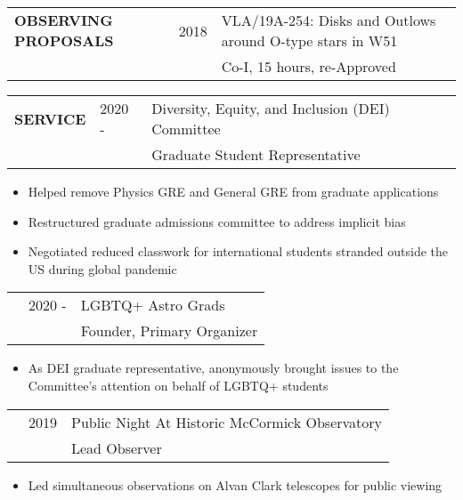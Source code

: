 \documentclass{article}
\begin{document}
\begin{tabular}{p{4cm}p{2.2cm}l}
    \large{\textbf{OBSERVING \newline PROPOSALS}} & 2018 & VLA/19A-254: Disks and Outlows around O-type stars in W51 \vspace{-0.45cm}\\
     & & \small Co-I, 15 hours, re-Approved \\
\end{tabular}
\vspace{0.5cm}


\begin{tabular}{p{4cm}p{2.2cm}l}
    \large{\textbf{SERVICE}} & 2020 - & Diversity, Equity, and Inclusion (DEI) Committee  \\
                 & & \small Graduate Student Representative
\end{tabular}

\begin{itemize}[leftmargin=8.2cm, nosep]
    \small \item Helped remove Physics GRE and General GRE from graduate applications
    \item Restructured graduate admissions committee to address implicit bias
    \item Negotiated reduced classwork for international students stranded outside the US during global pandemic
\end{itemize}

\vspace{0.25cm}
\begin{tabular}{p{4cm}p{2.2cm}l}
    &2020 - & LGBTQ+ Astro Grads \\
    &             & \small Founder, Primary Organizer
\end{tabular}

\begin{itemize}[leftmargin=8.2cm, nosep]
    \small \item As DEI graduate representative, anonymously brought issues to the Committee's attention on behalf of LGBTQ+ students
\end{itemize}

\vspace{0.25cm}
\begin{tabular}{p{4cm}p{2.2cm}l}
    &2019 & Public Night At Historic McCormick Observatory \\
    &             & \small Lead Observer
\end{tabular}

\begin{itemize}[leftmargin=8.2cm, nosep]
    \small \item Led simultaneous observations on Alvan Clark telescopes for public viewing
\end{itemize}
\end{document}
